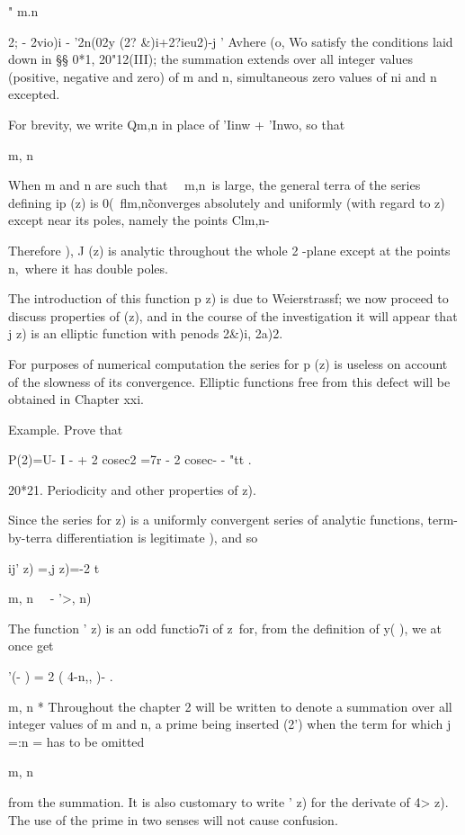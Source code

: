  " m.n \ \ {2; - 2vio)i - '2n(02y (2? \&)i+2?ieu2)-j ' Avhere (o, Wo
satisfy the conditions laid down in §§ 0*1, 20"12(III); the summation
extends over all integer values (positive, negative and zero) of m and
n, simultaneous zero values of ni and n excepted.

For brevity, we write Qm,n in place of 'Iinw + 'Inwo, so that

m, n

When m and n are such that \ \ m,n\ is large, the general terra of the
series defining ip (z) is 0(\ flm,n\~%
converges absolutely and uniformly (with regard to z) except near its
poles, namely the points Clm,n-

Therefore ), J (z) is analytic throughout the whole 2 -plane
except at the points n,\, where it has double poles.

The introduction of this function p z) is due to Weierstrassf; we now
proceed to discuss properties of (z), and in the course of the
investigation it will appear that j z) is an elliptic function with
penods 2\&)i, 2a)2.

For purposes of numerical computation the series for p (z) is useless
on account of the slowness of its convergence. Elliptic functions free
from this defect will be obtained in Chapter xxi.

Example. Prove that

P(2)=U- I - + 2 cosec2 =7r - 2 cosec- - "tt .

20*21. Periodicity and other properties of z).

Since the series for z) is a uniformly convergent series of analytic
functions, term-by-terra differentiation is legitimate ), and so

ij' z) =,j z)=-2 t

  m, n \ \ - '>, n)

The function ' z) is an odd functio7i of z\ for, from the definition
of y( ), we at once get

 '(- ) = 2 ( 4-n,, )- .

m, n * Throughout the chapter 2 will be written to denote a summation
over all integer values of m and n, a prime being inserted (2') when
the term for which j =:n = has to be omitted

m, n

from the summation. It is also customary to write ' z) for the
derivate of 4> z). The use of the prime in two senses will not cause
confusion.

}
